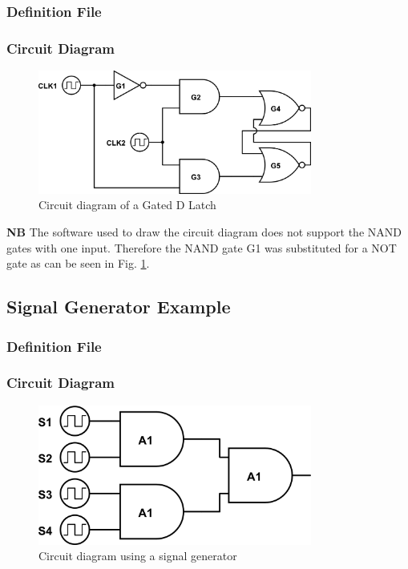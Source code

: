 \documentclass[a4paper,10pt]{article}
\begin{document}
\subsubsection{Definition File}


\subsubsection{Circuit Diagram}
\begin{figure}[h]
 \centering
 \includegraphics[width=9cm]{../../examples/gated-d-latch.png}
 \caption{Circuit diagram of a Gated D Latch}
 \label{fig:example-dlatch}
\end{figure}

\textbf{NB} The software used to draw the circuit diagram does not support the NAND gates with one input. Therefore the NAND gate G1 was substituted for a NOT gate as can be seen in Fig. \ref{fig:example-dlatch}.

\subsection{Signal Generator Example}

\subsubsection{Definition File}


\subsubsection{Circuit Diagram}
\begin{figure}[h]
 \centering
 \includegraphics[width=9cm]{../../examples/siggen.png}
 \caption{Circuit diagram using a signal generator}
 \label{fig:example-siggen}
\end{figure}
\end{document}
